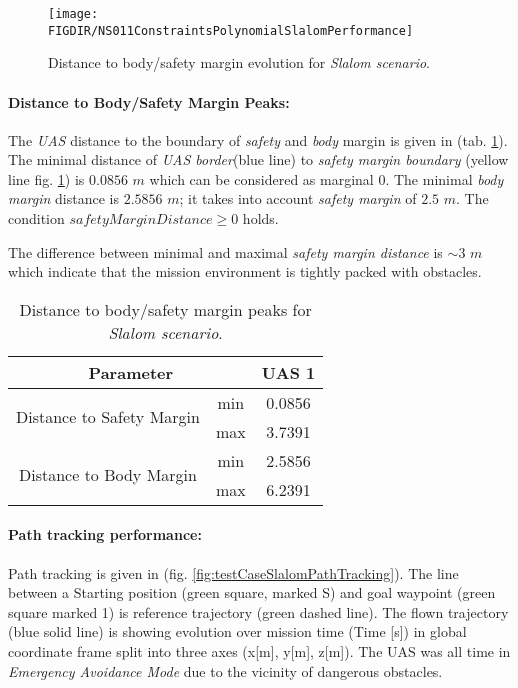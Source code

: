\begin{figure}[H]
    \centering
    \texttt{[image: \\FIGDIR/NS011ConstraintsPolynomialSlalomPerformance]} 
    \caption{Distance to body/safety margin evolution for \emph{Slalom scenario}.}
    \label{fig:testCaseSlalomAvoidancePerformance}
\end{figure}

\paragraph{Distance to Body/Safety Margin Peaks:} The \emph{UAS} distance to the boundary of \emph{safety} and  \emph{body} margin is given in (tab. \ref{tab:testCaseSlalomSafetyAndBodyMarginDistances}). The minimal distance of \emph{UAS border}(blue line) to \emph{safety margin boundary} (yellow line fig. \ref{fig:testCaseSlalomAvoidancePerformance}) is $0.0856$ $m$ which can be considered as marginal $0$. The minimal \emph{body margin} distance is $2.5856$ $m$; it takes into account \emph{safety margin} of $2.5$ $m$. The condition $safety Margin Distance \ge 0$ holds.
    
    
The difference between minimal and maximal \emph{safety margin distance} is $\sim 3$ $m$ which indicate that the mission environment is  tightly packed with obstacles.

\begin{table}[H]
    \centering
    \begin{tabular}{c|c||c}
    \multicolumn{2}{c||}{Parameter} & UAS 1 \\\hline\hline
    \multirow{2}{*}{Distance to Safety Margin} & min & 0.0856\\\cline{2-3}
                                            & max & 3.7391 \\\hline
    \multirow{2}{*}{Distance to Body Margin}   & min & 2.5856  \\\cline{2-3}
                                            & max & 6.2391 
    \end{tabular}
    \caption{Distance to body/safety margin peaks for \emph{Slalom scenario}.}
    \label{tab:testCaseSlalomSafetyAndBodyMarginDistances}
\end{table}


\paragraph{Path tracking performance:} Path tracking is given in (fig. \ref{fig:testCaseSlalomPathTracking}). The line between a Starting position (green square, marked S) and  goal waypoint (green square marked 1) is reference trajectory (green dashed line). The flown trajectory (blue solid line) is showing evolution over mission time (Time [s]) in global coordinate frame split into three axes (x[m], y[m], z[m]). The UAS was all time in \emph{Emergency Avoidance Mode} due to the vicinity of dangerous obstacles. 

